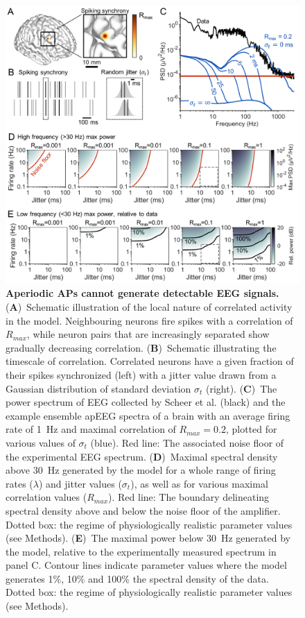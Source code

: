 \begin{figure}[t!]
    \centering
    \includegraphics[width=13.2cm]{Figures/chapter3/figure4.png}
    \caption[Aperiodic APs cannot generate detectable EEG signals]{\textbf{Aperiodic APs cannot generate detectable EEG signals.} (\textbf{A})~Schematic illustration of the local nature of correlated activity in the model. Neighbouring neurons fire spikes with a correlation of $R_{max}$, while neuron pairs that are increasingly separated show gradually decreasing correlation. (\textbf{B})~Schematic illustrating the timescale of correlation. Correlated neurons have a given fraction of their spikes synchronized (left) with a jitter value drawn from a Gaussian distribution of standard deviation $\sigma_t$ (right). (\textbf{C})~The power spectrum of EEG collected by Scheer et al. \cite{Scheer2006} (black) and the example ensemble apEEG spectra of a brain with an average firing rate of 1~\unit{\hertz} and maximal correlation of $R_{max}=0.2$, plotted for various values of $\sigma_t$ (blue). Red line: The associated noise floor of the experimental EEG spectrum. (\textbf{D})~Maximal spectral density above 30~\unit{\hertz} generated by the model for a whole range of firing rates ($\lambda$) and jitter values ($\sigma_t$), as well as for various maximal correlation values ($R_{max}$). Red line: The boundary delineating spectral density above and below the noise floor of the amplifier. Dotted box: the regime of physiologically realistic parameter values (see Methods). (\textbf{E})~The maximal power below 30~\unit{\hertz} generated by the model, relative to the experimentally measured spectrum in panel C. Contour lines indicate parameter values where the model generates 1\%, 10\% and 100\% the spectral density of the data. Dotted box: the regime of physiologically realistic parameter values (see Methods).}
    \label{fig:apEEG_jitter}
\end{figure}

